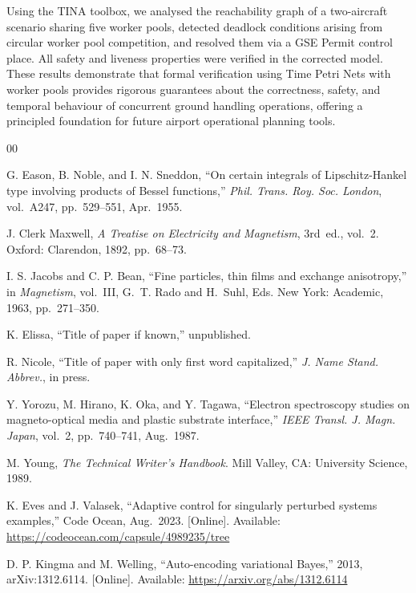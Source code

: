 \documentclass[conference]{IEEEtran}
\begin{document}
Using the TINA toolbox, we analysed the reachability graph of a two-aircraft
scenario sharing five worker pools, detected deadlock conditions arising from
circular worker pool competition, and resolved them via a GSE Permit control
place. All safety and liveness properties were verified in the corrected model.
These results demonstrate that formal verification using Time Petri Nets with
worker pools provides rigorous guarantees about the correctness, safety, and
temporal behaviour of concurrent ground handling operations, offering a
principled foundation for future airport operational planning tools.


\begin{thebibliography}{00}

G. Eason, B. Noble, and I. N. Sneddon, ``On certain integrals of
Lipschitz-Hankel type involving products of Bessel functions,''
\textit{Phil. Trans. Roy. Soc. London}, vol.~A247, pp.~529--551, Apr.~1955.

J. Clerk Maxwell, \textit{A Treatise on Electricity and Magnetism}, 3rd~ed.,
vol.~2. Oxford: Clarendon, 1892, pp.~68--73.

I. S. Jacobs and C. P. Bean, ``Fine particles, thin films and exchange
anisotropy,'' in \textit{Magnetism}, vol.~III, G.~T. Rado and H.~Suhl, Eds.
New York: Academic, 1963, pp.~271--350.

K. Elissa, ``Title of paper if known,'' unpublished.

R. Nicole, ``Title of paper with only first word capitalized,''
\textit{J. Name Stand. Abbrev.}, in press.

Y. Yorozu, M. Hirano, K. Oka, and Y. Tagawa, ``Electron spectroscopy studies on
magneto-optical media and plastic substrate interface,''
\textit{IEEE Transl. J. Magn. Japan}, vol.~2, pp.~740--741, Aug.~1987.

M. Young, \textit{The Technical Writer's Handbook}. Mill Valley, CA:
University Science, 1989.

K. Eves and J. Valasek, ``Adaptive control for singularly perturbed systems
examples,'' Code Ocean, Aug.~2023. [Online]. Available:
\url{https://codeocean.com/capsule/4989235/tree}

D. P. Kingma and M. Welling, ``Auto-encoding variational Bayes,'' 2013,
arXiv:1312.6114. [Online]. Available: \url{https://arxiv.org/abs/1312.6114}


\end{thebibliography}
\end{document}
